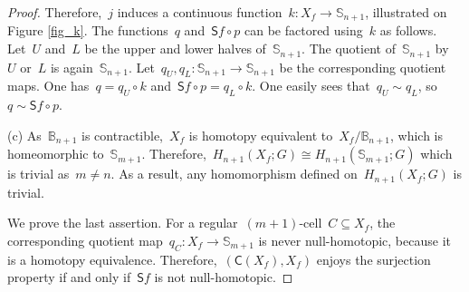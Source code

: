 \documentclass[english,11pt]{article}
\theoremstyle{plain}
\theoremstyle{remark}
\theoremstyle{definition}
\newcommand{\Sp}{\mathbb{S}}
\newcommand{\BB}{\mathbb{B}}
\newcommand{\C}[1]{\mathsf{C}(#1)}%
\newcommand{\sus}{\mathsf{S}}
\begin{document}
\begin{proof}
Therefore,~$j$ induces a continuous function~$k:X_f\to\Sp_{n+1}$, illustrated on Figure \ref{fig_k}. The functions~$q$ and~$\sus f\circ p$ can be factored using~$k$ as follows. Let~$U$ and~$L$ be the upper and lower halves of~$\Sp_{n+1}$. The quotient of~$\Sp_{n+1}$ by~$U$ or~$L$ is again~$\Sp_{n+1}$. Let~$q_U,q_L:\Sp_{n+1}\to\Sp_{n+1}$ be the corresponding quotient maps. One has~$q=q_U\circ k$ and~$\sus f\circ p=q_L\circ k$. One easily sees that~$q_U\sim q_L$, so~$q\sim\sus f\circ p$.



(c) As~$\BB_{n+1}$ is contractible,~$X_f$ is homotopy equivalent to~$X_f/\BB_{n+1}$, which is homeomorphic to~$\Sp_{m+1}$. Therefore,~$H_{n+1}(X_f;G)\cong H_{n+1}(\Sp_{m+1};G)$ which is trivial as~$m\neq n$. As a result, any homomorphism defined on~$H_{n+1}(X_f;G)$ is trivial.

We prove the last assertion. For a regular~$(m+1)$-cell~$C\subseteq X_f$, the corresponding quotient map~$q_C:X_f\to\Sp_{m+1}$ is never null-homotopic, because it is a homotopy equivalence. Therefore,~$(\C{X_f},X_f)$ enjoys the surjection property if and only if~$\sus f$ is not null-homotopic.
\end{proof}
\end{document}

